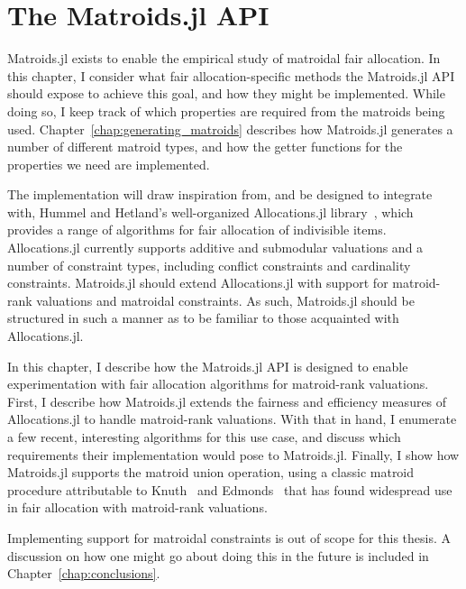 \chapter{The Matroids.jl API}
\label{chap:matroids.jl}
Matroids.jl exists to enable the empirical study of matroidal fair allocation. In this chapter, I consider what fair allocation-specific methods the Matroids.jl API should expose to achieve this goal, and how they might be implemented. While doing so, I keep track of which properties are required from the matroids being used. Chapter~\ref{chap:generating_matroids} describes how Matroids.jl generates a number of different matroid types, and how the getter functions for the properties we need are implemented.

The implementation will draw inspiration from, and be designed to integrate with, Hummel and Hetland's well-organized Allocations.jl library~\cite{Hetland_Allocations_jl_2022}, which provides a range of algorithms for fair allocation of indivisible items. Allocations.jl currently supports additive and submodular valuations and a number of constraint types, including conflict constraints and cardinality constraints. Matroids.jl should extend Allocations.jl with support for matroid-rank valuations and matroidal constraints. As such, Matroids.jl should be structured in such a manner as to be familiar to those acquainted with Allocations.jl.

In this chapter, I describe how the Matroids.jl API is designed to enable experimentation with fair allocation algorithms for matroid-rank valuations. First, I describe how Matroids.jl extends the fairness and efficiency measures of Allocations.jl to handle matroid-rank valuations. With that in hand, I enumerate a few recent, interesting algorithms for this use case, and discuss which requirements their implementation would pose to Matroids.jl. Finally, I show how Matroids.jl supports the matroid union operation, using a classic matroid procedure attributable to Knuth~\cite{knuth1973matroidpartitioning} and Edmonds~\cite{Edmonds2009} that has found widespread use in fair allocation with matroid-rank valuations.

Implementing support for matroidal constraints is out of scope for this thesis. A discussion on how one might go about doing this in the future is included in Chapter~\ref{chap:conclusions}.

